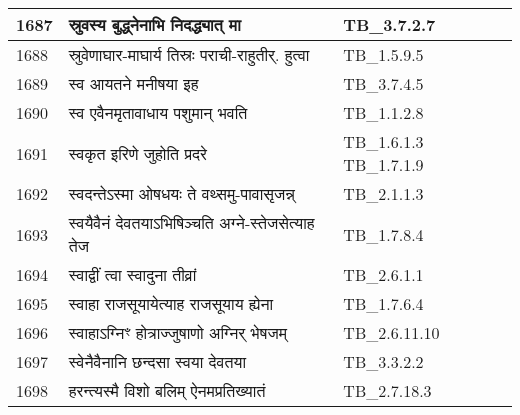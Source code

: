 \documentclass[17pt]{extarticle}
\begin{document}
\begin{longtable}{||p{0.4in}||p{4.9in}||p{0.9in}||}
    1687 & स्रुवस्य बुद्ध्नेनाभि निदद्ध्यात् मा & TB\_3.7.2.7       \\
    
    \hline
        
    1688 & स्रुवेणाघार{-}माघार्य तिस्रः पराची{-}राहुतीर्. हुत्वा & TB\_1.5.9.5       \\
    
    \hline
        
    1689 & स्व आयतने मनीषया इह & TB\_3.7.4.5       \\
    
    \hline
        
    1690 & स्व एवैनमृतावाधाय पशुमान् भवति & TB\_1.1.2.8       \\
    
    \hline
        
    1691 & स्वकृत इरिणे जुहोति प्रदरे & TB\_1.6.1.3 TB\_1.7.1.9       \\
    
    \hline
        
    1692 & स्वदन्तेऽस्मा ओषधयः ते वथ्समु{-}पावासृजन्न् & TB\_2.1.1.3       \\
    
    \hline
        
    1693 & स्वयैवैनं देवतयाऽभिषिञ्चति अग्ने{-}स्तेजसेत्याह तेज & TB\_1.7.8.4       \\
    
    \hline
        
    1694 & स्वाद्वीं त्वा स्वादुना तीव्रां & TB\_2.6.1.1       \\
    
    \hline
        
    1695 & स्वाहा राजसूयायेत्याह राजसूयाय ह्येना & TB\_1.7.6.4       \\
    
    \hline
        
    1696 & स्वाहाऽग्निꣳ होत्राज्जुषाणो अग्निर् भेषजम् & TB\_2.6.11.10       \\
    
    \hline
        
    1697 & स्वेनैवैनानि छन्दसा स्वया देवतया & TB\_3.3.2.2       \\
    
    \hline
        
    1698 & हरन्त्यस्मै विशो बलिम् ऐनमप्रतिख्यातं & TB\_2.7.18.3       \\
    
    \hline
        

\end{longtable}
\end{document}
